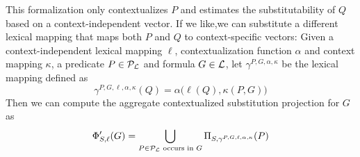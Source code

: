 
This formalization only contextualizes $P$ and estimates the substitutability of
$Q$ based on a context-independent vector. If we like,we can substitute a
different lexical mapping that maps both $P$ and $Q$ to context-specific
vectors: Given a context-independent lexical mapping $\ell$, contextualization
function $\alpha$ and context mapping $\kappa$, a predicate $P \in
{\cal{P}}_{{\cal{L}}}$ and formula $G \in {\cal{L}}$, let $\gamma^{P, G, \alpha,
\kappa}$ be the lexical mapping defined as \[\gamma^{P, G, \ell, \alpha,
\kappa}(Q) = \alpha\big(\ell(Q), \kappa(P, G)\big) \] Then we can compute the
aggregate contextualized substitution projection for $G$ as \[\Phi'_{S, \ell}(G)
= \bigcup_{P \in {\cal{P}}_{{\cal{L}}} \text{ occurs in } G} \Pi_{S, \gamma^{P, G, \ell, \alpha,
\kappa}}(P) \]

